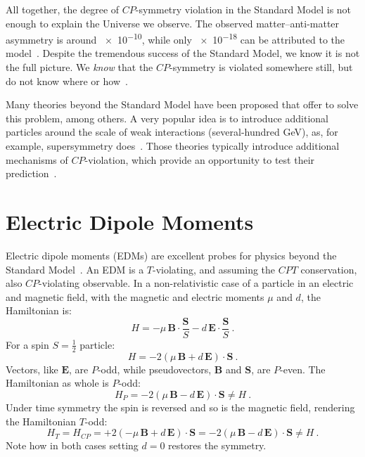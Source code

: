 All together, the degree of $CP$-symmetry violation in the Standard Model is not enough to explain the Universe we observe. The observed matter--anti-matter asymmetry is around \num{e-10}, while only \num{e-18} can be attributed to the model~\cite{Riotto1999}. Despite the tremendous success of the Standard Model, we know it is not the full picture. We \emph{know} that the $CP$-symmetry is violated somewhere still, but do not know where or how~\cite{Pospelov2005}.%

Many theories beyond the Standard Model have been proposed that offer to solve this problem, among others. A very popular idea is to introduce additional particles around the scale of weak interactions (several-hundred GeV), as, for example, supersymmetry does~\cite{Supersymmetry}. Those theories typically introduce additional mechanisms of $CP$-violation, which provide an opportunity to test their prediction~\cite{Ellis1989}.



\section{Electric Dipole Moments}
Electric dipole moments (EDMs) are excellent probes for physics beyond the Standard Model~\cite{Pospelov2005}. An EDM is a $T$-violating, and assuming the $CPT$ conservation, also $CP$-violating observable. In a non-relativistic case of a particle in an electric and magnetic field, with the magnetic and electric moments $\mu$ and $d$, the Hamiltonian is:
\begin{equation}
  H = - \mu \, \mathbf{B} \cdot \frac{\mathbf{S}}{S} - d \, \mathbf{E} \cdot \frac{\mathbf{S}}{S} \ .
\end{equation}
For a spin $S = \tfrac{1}{2}$ particle:
\begin{equation}
  H = - 2 \left( \mu \, \mathbf{B} + d \, \mathbf{E} \right ) \cdot \mathbf{S} \ .
\end{equation}
Vectors, like $\mathbf{E}$, are $P$-odd, while pseudovectors, $\mathbf{B}$ and $\mathbf{S}$, are $P$-even. The Hamiltonian as whole is $P$-odd:
\begin{equation}
  H_P = - 2 \left( \mu \, \mathbf{B} - d \, \mathbf{E} \right ) \cdot \mathbf{S} \neq H \ .
\end{equation}
Under time symmetry the spin is reversed and so is the magnetic field, rendering the Hamiltonian $T$-odd:
\begin{equation}
  H_T = H_{CP} = + 2 \left( - \mu \, \mathbf{B} + d \, \mathbf{E} \right ) \cdot \mathbf{S} = - 2 \left( \mu \, \mathbf{B} - d \, \mathbf{E} \right ) \cdot \mathbf{S} \neq H \ .
\end{equation}
Note how in both cases setting $d = 0$ restores the symmetry.

